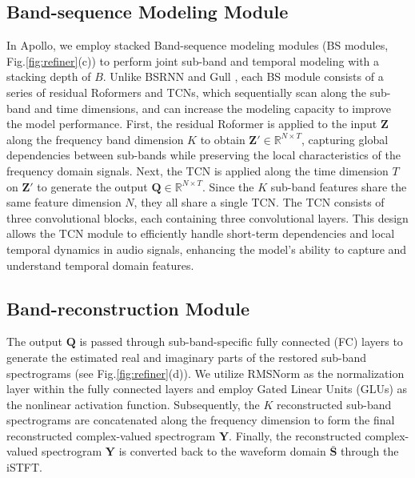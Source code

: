 \subsection{Band-sequence Modeling Module}
In Apollo, we employ stacked Band-sequence modeling modules (BS modules, Fig.\ref{fig:refiner}(c)) to perform joint sub-band and temporal modeling with a stacking depth of $B$. Unlike BSRNN \cite{luo2023music} and Gull \cite{luo2024gull}, each BS module consists of a series of residual Roformers \cite{su2024roformer} and TCNs, which sequentially scan along the sub-band and time dimensions, and can increase the modeling capacity to improve the model performance. First, the residual Roformer is applied to the input $\mathbf{Z}$ along the frequency band dimension $K$ to obtain $\mathbf{Z}'\in \mathbb{R}^{N\times T}$, capturing global dependencies between sub-bands while preserving the local characteristics of the frequency domain signals. Next, the TCN is applied along the time dimension $T$ on $\mathbf{Z}'$ to generate the output $\mathbf{Q}\in \mathbb{R}^{N\times T}$. Since the $K$ sub-band features share the same feature dimension $N$, they all share a single TCN. The TCN consists of three convolutional blocks, each containing three convolutional layers. This design allows the TCN module to efficiently handle short-term dependencies and local temporal dynamics in audio signals, enhancing the model's ability to capture and understand temporal domain features.

\subsection{Band-reconstruction Module}
The output $\mathbf{Q}$ is passed through sub-band-specific fully connected (FC) layers to generate the estimated real and imaginary parts of the restored sub-band spectrograms (see Fig.\ref{fig:refiner}(d)). We utilize RMSNorm as the normalization layer within the fully connected layers and employ Gated Linear Units (GLUs) as the nonlinear activation function. Subsequently, the $K$ reconstructed sub-band spectrograms are concatenated along the frequency dimension to form the final reconstructed complex-valued spectrogram $\mathbf{Y}$. Finally, the reconstructed complex-valued spectrogram $\mathbf{Y}$ is converted back to the waveform domain $\bar{\mathbf{S}}$ through the iSTFT.

